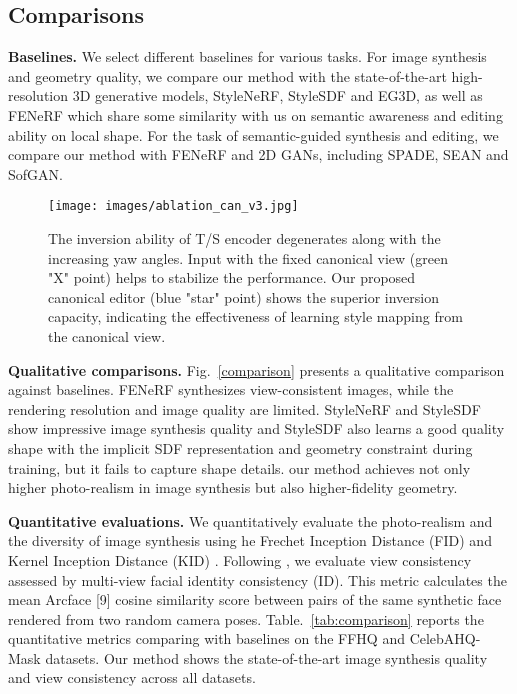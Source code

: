 \documentclass[acmtog]{acmart}
\begin{document}
\subsection{Comparisons}
\label{sec:4.1}
\noindent \textbf{Baselines.} We select different baselines for various tasks. For image synthesis and geometry quality, we compare our method with the state-of-the-art high-resolution 3D generative models, StyleNeRF, StyleSDF and EG3D, as well as FENeRF which share some similarity with us on semantic awareness and editing ability on local shape. For the task of semantic-guided synthesis and editing, we compare our method with FENeRF and 2D GANs, including SPADE, SEAN and SofGAN. 

\begin{figure}[b]
  \centering
  \texttt{[image: images/ablation\_can\_v3.jpg]}
  \caption{The inversion ability of T/S encoder degenerates along with the increasing yaw angles. Input with the fixed canonical view (green "X" point) helps to stabilize the performance. Our proposed canonical editor (blue "star" point) shows the superior inversion capacity, indicating the effectiveness of learning style mapping from the canonical view.}
  \Description{}
  \label{fig:chart}
\end{figure}

\noindent \textbf{Qualitative comparisons.} Fig.~\ref{comparison} presents a qualitative comparison against baselines. FENeRF synthesizes view-consistent images, while the rendering resolution and image quality are limited. StyleNeRF and StyleSDF show impressive image synthesis quality and StyleSDF also learns a good quality shape with the implicit SDF representation and geometry constraint during training, but it fails to capture shape details. our method achieves not only higher photo-realism in image synthesis but also higher-fidelity geometry.

\noindent \textbf{Quantitative evaluations.} We quantitatively evaluate the photo-realism and the diversity of image synthesis using he Frechet Inception Distance (FID) \cite{heusel2017gans} and Kernel Inception Distance (KID) \cite{binkowski2018demystifying}. Following \cite{eg3d}, we evaluate view consistency assessed by multi-view facial identity consistency (ID). This metric calculates the mean Arcface [9] cosine similarity score between pairs of the same synthetic face rendered from two random camera poses. Table.~\ref{tab:comparison} reports the quantitative metrics comparing with baselines on the FFHQ and CelebAHQ-Mask datasets. Our method shows the state-of-the-art image synthesis quality and view consistency across all datasets. 
\end{document}
